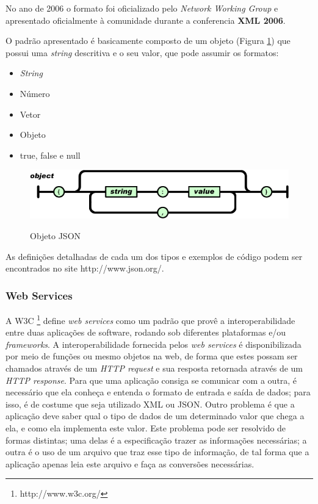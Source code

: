 No ano de 2006 o formato foi oficializado pelo \emph{Network Working Group} e apresentado oficialmente à
comunidade durante a conferencia \textbf{XML 2006}.

O padrão apresentado é basicamente composto de um objeto (Figura \ref{fig:json_obj}) que possui uma \emph{string}
descritiva e o seu valor, que pode assumir os formatos:

\begin{itemize}
    \item \emph{String}
    \item Número
    \item Vetor
    \item Objeto
    \item true, false e null
\end{itemize}

\begin{figure}[ht]
\begin{center}
\scalebox{0.6} {
    \includegraphics{img/json_obj.png}}
\end{center}
  \caption{Objeto JSON}
  \label{fig:json_obj}
\end{figure}

As definições detalhadas de cada um dos tipos e exemplos de código podem ser encontrados no site
http://www.json.org/.

\subsubsection{Web Services}

A W3C \footnote{http://www.w3c.org/} define \emph{web services} como um padrão que provê a
interoperabilidade entre duas aplicações de software, rodando sob diferentes plataformas e/ou
\emph{frameworks}.
A interoperabilidade fornecida pelos \emph{web services} é disponibilizada por meio de funções
ou mesmo objetos na web, de forma que estes possam ser chamados através de um \emph{HTTP
request} e sua resposta retornada através de um \emph{HTTP response}.
Para que uma aplicação consiga se comunicar com a outra, é necessário que ela conheça
e entenda o formato de entrada e saída de dados; para isso, é de costume que seja utilizado XML ou JSON.
Outro problema é que a aplicação deve saber qual o tipo de dados de um determinado
valor que chega a ela, e como ela implementa este valor. Este problema pode ser resolvido
de formas distintas; uma delas é a especificação trazer as informações necessárias; a outra
é o uso de um arquivo que traz esse tipo de informação, de tal forma que a aplicação
apenas leia este arquivo e faça as conversões necessárias. 

